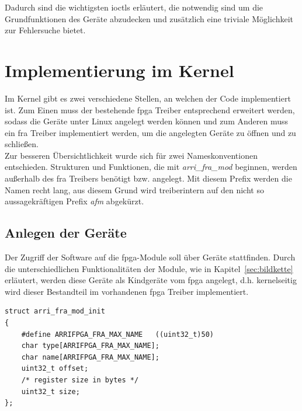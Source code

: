Dadurch sind die wichtigsten \ac{ioctl}s erläutert, die notwendig sind um die Grundfunktionen des Geräte abzudecken und zusätzlich eine triviale Möglichkeit zur Fehlersuche bietet.

\section{Implementierung im Kernel}\label{sec:kernel}
Im Kernel gibt es zwei verschiedene Stellen, an welchen der Code implementiert ist. Zum Einen muss der bestehende \ac{fpga} Treiber entsprechend erweitert werden, sodass die Geräte unter Linux angelegt werden können und zum Anderen muss ein \ac{fra} Treiber implementiert werden, um die angelegten Geräte zu öffnen und zu schließen. \\

Zur besseren Übersichtlichkeit wurde sich für zwei Nameskonventionen entschieden. Strukturen und Funktionen, die mit \textit{arri\_fra\_mod} beginnen, werden außerhalb des \ac{fra} Treibers benötigt bzw. angelegt. Mit diesem Prefix werden die Namen recht lang, aus diesem Grund wird treiberintern auf den nicht so aussagekräftigen Prefix \textit{afm} abgekürzt.




\subsection{Anlegen der Geräte}
Der Zugriff der Software auf die \ac{fpga}-Module soll über Geräte stattfinden. Durch die unterschiedlichen Funktionalitäten der Module, wie in Kapitel~\ref{sec:bildkette} erläutert, werden diese Geräte als Kindgeräte vom \ac{fpga} angelegt, d.h. kernelseitig wird dieser Bestandteil im vorhandenen \ac{fpga} Treiber implementiert. 

\begin{lstfloat}
\begin{lstlisting}
struct arri_fra_mod_init 
{
	#define ARRIFPGA_FRA_MAX_NAME   ((uint32_t)50)
	char type[ARRIFPGA_FRA_MAX_NAME];
	char name[ARRIFPGA_FRA_MAX_NAME];
	uint32_t offset;
	/* register size in bytes */
	uint32_t size;
};
\end{lstlisting}
\end{lstfloat}

